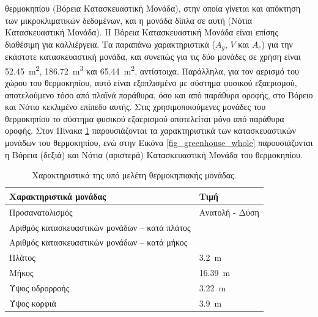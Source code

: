 \documentclass[12pt, a4paper]{report} %
\newcommand{\english}{\foreignlanguage{english}}
\begin{document}
θερμοκηπίου (Βόρεια Κατασκευαστική Μονάδα), στην οποία γίνεται και απόκτηση των μικροκλιματικών δεδομένων, και η μονάδα 
δίπλα σε αυτή (Νότια Κατασκευαστική Μονάδα). Η Βόρεια Κατασκευαστική Μονάδα είναι επίσης διαθέσιμη για καλλιέργεια. Τα 
παραπάνω χαρακτηριστικά (\english{$A_g$}, \english{$V$} και \english{$A_c$}) για την εκάστοτε κατασκευαστική μονάδα, και 
συνεπώς για τις δύο μονάδες σε χρήση είναι \SI{52,45}{\meter\squared}, \SI{186,72}{\meter\cubed} και 
\SI{65,44}{\meter\squared}, αντίστοιχα. Παράλληλα, για τον αερισμό του χώρου του θερμοκηπίου, αυτό είναι εξοπλισμένο με 
σύστημα φυσικού εξαερισμού, αποτελούμενο τόσο από πλαϊνά παράθυρα, όσο και από παράθυρα οροφής, στο Βόρειο και Νότιο 
κεκλιμένο επίπεδο αυτής. Στις χρησιμοποιούμενες μονάδες του θερμοκηπίου το σύστημα φυσικού εξαερισμού αποτελείται μόνο 
από παράθυρα οροφής. Στον Πίνακα \ref{tab_greenhouse_characteristics} παρουσιάζονται τα χαρακτηριστικά των κατασκευαστικών 
μονάδων του θερμοκηπίου, ενώ στην Εικόνα \ref{fig_greenhouse_whole} παρουσιάζονται η Βόρεια (δεξιά) και Νότια (αριστερά) 
Κατασκευαστική Μονάδα του θερμοκηπίου.

\begin{table}[ht]
    \centering
    \caption{Χαρακτηριστικά της υπό μελέτη θερμοκηπιακής μονάδας.}\label{tab_greenhouse_characteristics} 
    \begin{tabular}{>{\centering\arraybackslash}m{7.5cm} >{\centering\arraybackslash}m{7.5cm}}
        \toprule
        \textbf{Χαρακτηριστικά μονάδας} & \textbf{Τιμή} \\
        \midrule
        Προσανατολισμός & Ανατολή - Δύση \\
        Αριθμός κατασκευαστικών μονάδων – κατά πλάτος & 2 \\ 
        Αριθμός κατασκευαστικών μονάδων – κατά μήκος & 0 \\
        Πλάτος & \SI{3,2}{\meter} \\
        Μήκος & \SI{16,39}{\meter} \\
        Ύψος υδρορροής & \SI{3,22}{\meter} \\
        Ύψος κορφιά & \SI{3,9}{\meter} \\
        \hline
        \end{tabular}
\end{table}
\end{document}
